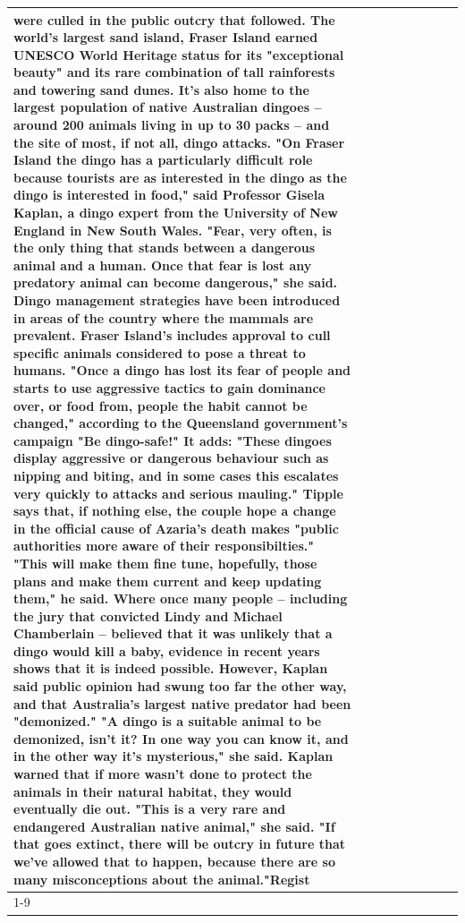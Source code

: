 \begin{table}[H]
\begin{tabular}{lllrlllll}
were culled in the public outcry that followed. The world's largest sand island, Fraser Island earned UNESCO World Heritage status for its "exceptional beauty" and its rare combination of tall rainforests and towering sand dunes. It's also home to the largest population of native Australian dingoes -- around 200 animals living in up to 30 packs -- and the site of most, if not all, dingo attacks. "On Fraser Island the dingo has a particularly difficult role because tourists are as interested in the dingo as the dingo is interested in food," said Professor Gisela Kaplan, a dingo expert from the University of New England in New South Wales. "Fear, very often, is the only thing that stands between a dangerous animal and a human. Once that fear is lost any predatory animal can become dangerous," she said. Dingo management strategies have been introduced in areas of the country where the mammals are prevalent. Fraser Island's includes approval to cull specific animals considered to pose a threat to humans. "Once a dingo has lost its fear of people and starts to use aggressive tactics to gain dominance over, or food from, people the habit cannot be changed," according to the Queensland government's campaign "Be dingo-safe!" It adds: "These dingoes display aggressive or dangerous behaviour such as nipping and biting, and in some cases this escalates very quickly to attacks and serious mauling." Tipple says that, if nothing else, the couple hope a change in the official cause of Azaria's death makes "public authorities more aware of their responsibilties." "This will make them fine tune, hopefully, those plans and make them current and keep updating them," he said. Where once many people -- including the jury that convicted Lindy and Michael Chamberlain -- believed that it was unlikely that a dingo would kill a baby, evidence in recent years shows that it is indeed possible. However, Kaplan said public opinion had swung too far the other way, and that Australia's largest native predator had been "demonized." "A dingo is a suitable animal to be demonized, isn't it? In one way you can know it, and in the other way it's mysterious," she said. Kaplan warned that if more wasn't done to protect the animals in their natural habitat, they would eventually die out. "This is a very rare and endangered Australian native animal," she said. "If that goes extinct, there will be outcry in future that we've allowed that to happen, because there are so many misconceptions about the animal."Regist \\
\cline{1-9}

\end{tabular}
\end{table}
